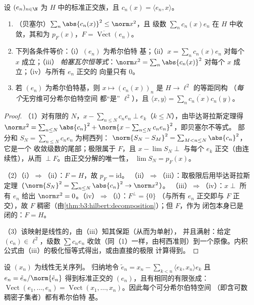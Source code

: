\begin{theorem}\label{thm:b3:hilbert:parseval}
设 $(e_n)_{n\in\N}$ 为 $H$ 中的标准正交族，且 $c_n(x) =
\langle e_n, x\rangle$。
\begin{enumerate}
  \item （贝塞尔）$\sum_n\abs{c_n(x)}^2 \leq \norm x^2$，且
        级数 $\sum_nc_n(x)e_n$ 在 $H$ 中收敛，其和为
        $p_F(x)$，$F = \overline{\operatorname{Vect}}(e_n)$。
  \item 下列各条件等价：（i）$(e_n)$ 为希尔伯特
        基；（ii）$x = \sum_nc_n(x)e_n$ 对每个 $x$ 成立；（iii）
        \emph{帕塞瓦尔恒等式}：$\norm x^2
        = \sum_n\abs{c_n(x)}^2$ 对每个 $x$ 成立；（iv）与所有 $e_n$ 正交的
        向量只有 $0$。
  \item 若 $(e_n)$ 为希尔伯特基，则 $x \mapsto (c_n(x))_n$
        是 $H \to \ell^2$ 的等距同构
        （\emph{每个}无穷维可分希尔伯特空间
        都“是” $\ell^2$），且 $\langle x, y\rangle =
        \sum_n\overline{c_n(x)}c_n(y)$。
\end{enumerate}
\end{theorem}

\begin{proof}
（1）对有限的 $N$，$x - \sum_{n\leq N}c_ne_n \perp e_k$（$k
\leq N$），由毕达哥拉斯定理得 $\norm x^2 = \sum_{n\leq
N}\abs{c_n}^2 + \norm{x - \sum_{n\leq N}c_ne_n}^2$，即贝塞尔不等式。
部分和 $S_N = \sum_{n\leq N}c_ne_n$ 为柯西列：
$\norm{S_N - S_M}^2 = \sum_{M<n\leq N}\abs{c_n}^2$，它是一个
收敛级数的尾部；极限属于 $F$，且 $x - \lim S_N
\perp$ 与每个 $e_k$ 正交（由连续性），从而 $\perp F$。由正交分解的唯一性，
$\lim S_N = p_F(x)$。

（2）（i）$\Rightarrow$（ii）：$F = H$，故 $p_F = \mathrm{id}$。
（ii）$\Rightarrow$（iii）：取极限后用毕达哥拉斯定理（$\norm{S_N}^2
= \sum_{n \leq N}\abs{c_n}^2 \to \norm x^2$）。
（iii）$\Rightarrow$（iv）：$x \perp$ 所有 $e_n$ 给出 $\norm x^2 =
0$。（iv）$\Rightarrow$（i）：$F^\perp = \{0\}$
（与所有 $e_n$ 正交即与 $F$ 正交），故 $F$
稠密（由\cref{thm:b3:hilbert:decomposition}）；但 $F$，作为
闭包本身已是闭的：$F = H$。

（3）该映射是线性的，由（iii）知其保距（从而为单射），
并且满射：给定 $(c_n) \in \ell^2$，级数 $\sum
c_ne_n$ 收敛（同（1）一样，由柯西准则）到一个原像。内积
公式由（iii）的极化恒等式得出，或由直接的极限
计算得到。
\end{proof}

\begin{proposition}\label{prop:b3:hilbert:gramschmidt}
设 $(x_n)$ 为线性无关序列。
归纳地令 $\tilde e_n = x_n - \sum_{k<n}\langle e_k,
x_n\rangle e_k$ 且 $e_n = \tilde e_n/\norm{\tilde e_n}$
得到标准正交的 $(e_n)$，且有相同的有限张成：
$\operatorname{Vect}(e_1, \dots, e_n) = \operatorname{Vect}
(x_1, \dots, x_n)$。因此每个可分希尔伯特空间
（即含可数稠密子集者）都有希尔伯特
基。
\end{proposition}

